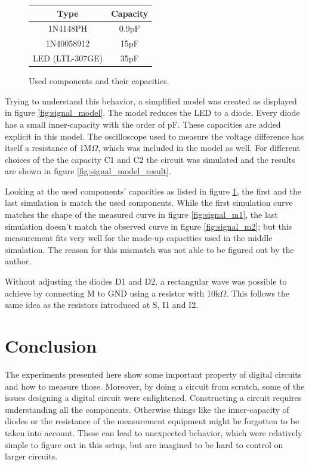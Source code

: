 \documentclass[journal]{IEEEtran}
\begin{document}
\begin{figure}
	\centering
	\begin{tabular}{c | c}
		  Type & Capacity \\ \hline
		  1N4148PH   & 0.9pF \\
		  1N40058912 & 15pF  \\
		  LED (LTL-307GE)  & 35pF\\
	\end{tabular}
	\caption{Used components and their capacities.}
	\label{fig:signal_capacity_real} 
\end{figure}

Trying to understand this behavior, a simplified model was created as displayed
in figure \ref{fig:signal_model}. The model reduces the LED to a diode. Every
diode has a small inner-capacity with the order of pF. These capacities are
added explicit in this model. The oscilloscope used to measure the voltage difference
has itself a resistance of 1M$\Omega$, which was included in the model as well.
For different choices of the the capacity C1 and C2 the circuit was simulated
and the results are shown in figure \ref{fig:signal_model_result}. 

Looking at the used components' capacities as listed in figure
\ref{fig:signal_capacity_real}, the first and the last simulation is match
the used components. While the first simulation curve matches the shape of the
measured curve in figure \ref{fig:signal_m1}, the last simulation doesn't match
the observed curve in figure \ref{fig:signal_m2}; but this measurement fits very
well for the made-up capacities used in the middle simulation. The reason for
this mismatch was not able to be figured out by the author.

Without adjusting the diodes D1 and D2, a rectangular wave was possible to
achieve by connecting M to GND using a resistor with 10k$\Omega$. This follows
the same idea as the resistors introduced at S, I1 and I2.

\section{Conclusion}

The experiments presented here show some important property of digital circuits
and how to measure those. Moreover, by doing a circuit from scratch, some of
the issues designing a digital circuit were enlightened. Constructing a circuit
requires understanding all the components. Otherwise things like the
inner-capacity of diodes or the resistance of the measurement equipment might be
forgotten to be taken into account. These can lead to unexpected behavior, which
were relatively simple to figure out in this setup, but are imagined to be hard
to control on larger circuits.
\end{document}
